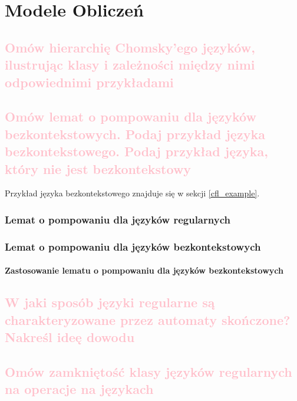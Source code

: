 \chapter{Modele Obliczeń} 

\section{\textcolor{pink}{Omów hierarchię Chomsky'ego języków, ilustrując klasy i zależności między nimi odpowiednimi przykładami}}


\section{\textcolor{pink}{Omów lemat o pompowaniu dla języków bezkontekstowych. Podaj przykład
języka bezkontekstowego. Podaj przykład języka, który nie jest bezkontekstowy}}

Przykład języka bezkontekstowego znajduje się w sekcji \ref{cfl_example}.

\subsection{Lemat o pompowaniu dla języków regularnych}
\label{regular-pumping}


\subsection{Lemat o pompowaniu dla języków bezkontekstowych}


\subsubsection{Zastosowanie lematu o pompowaniu dla języków bezkontekstowych}
\label{context-pumping}


\section{\textcolor{pink}{W jaki sposób języki regularne są charakteryzowane przez automaty skończone?
Nakreśl ideę dowodu}}


\section{\textcolor{pink}{Omów zamkniętość klasy języków regularnych na operacje na językach}}



